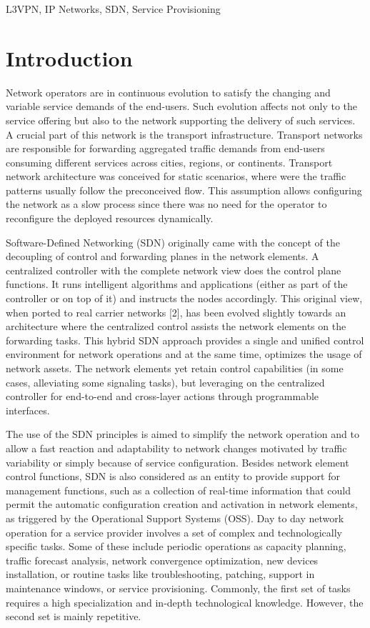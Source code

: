 \documentclass[conference]{IEEEtran}
\begin{document}
\begin{IEEEkeywords}
L3VPN, IP Networks, SDN, Service Provisioning
\end{IEEEkeywords}

\section{Introduction}
Network operators are in continuous evolution to satisfy the changing and variable service demands of the end-users. Such evolution affects not only to the service offering but also to the network supporting the delivery of such services. A crucial part of this network is the transport infrastructure. Transport networks are responsible for forwarding aggregated traffic demands from end-users consuming different services across cities, regions, or continents. Transport network architecture was conceived for static scenarios, where were the traffic patterns usually follow the preconceived flow. This assumption allows configuring the network as a slow process since there was no need for the operator to reconfigure the deployed resources dynamically.

Software-Defined Networking (SDN) originally \cite{} came with the concept of the decoupling of control and forwarding planes in the network elements. A centralized controller with the complete network view does the control plane functions. It runs intelligent algorithms and applications (either as part of the controller or on top of it) and instructs the nodes accordingly. This original view, when ported to real carrier networks [2], has been evolved slightly towards an architecture where the centralized control assists the network elements on the forwarding tasks. This hybrid SDN approach provides a single and unified control environment for network operations and at the same time, optimizes the usage of network assets. The network elements yet retain control capabilities (in some cases, alleviating some signaling tasks), but leveraging on the centralized controller for end-to-end and cross-layer actions through programmable interfaces. 

The use of the SDN principles is aimed to simplify the network operation and to allow a fast reaction and adaptability to network changes motivated by traffic variability or simply because of service configuration. Besides network element control functions, SDN is also considered as an entity to provide support for management functions, such as a collection of real-time information that could permit the automatic configuration creation and activation in network elements, as triggered by the Operational Support Systems (OSS). Day to day network operation for a service provider involves a set of complex and technologically specific tasks. Some of these include periodic operations as capacity planning, traffic forecast analysis, network convergence optimization, new devices installation, or routine tasks like troubleshooting, patching, support in maintenance windows, or service provisioning. Commonly, the first set of tasks requires a high specialization and in-depth technological knowledge. However, the second set is mainly repetitive. 
\end{document}

